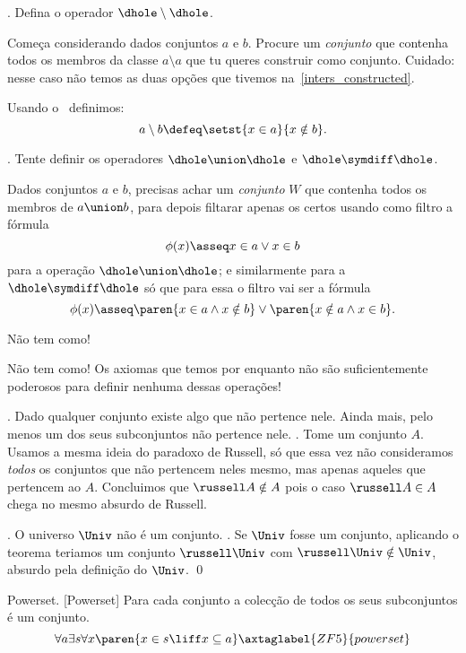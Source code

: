 {%
\exercise.
Defina o operador $\dhole\setminus\dhole$.

\hint
Começa considerando dados conjuntos $a$ e $b$.
Procure um \emph{conjunto} que contenha todos os membros
da classe $a\setminus a$ que tu queres construir como conjunto.
Cuidado: nesse caso não temos as duas opções que tivemos
na~\ref{inters_constructed}.

\solution
Usando o~ definimos:
$$
a\setminus b\defeq \setst {x \in a} {x \notin b}.
$$

\endexercise

\exercise.
\label{cannot_define_union_yet}%
Tente definir os operadores $\dhole\union\dhole$ e $\dhole\symdiff\dhole$.

\hint
Dados conjuntos $a$ e $b$,
precisas achar um \emph{conjunto} $W$
que contenha todos os membros de $a\union b$,
para depois filtarar apenas os certos usando
como filtro a fórmula
$$
\phi(x) \asseq
x \in a \lor x \in b
$$
para a operação $\dhole\union\dhole$;
e similarmente para a $\dhole\symdiff\dhole$ só que
para essa o filtro vai ser a fórmula
$$
\phi(x)\asseq
\paren{x \in a \land x \notin b}
\lor
\paren{x \notin a \land x \in b}.
$$

\hint
Não tem como!

\solution
Não tem como!
Os axiomas que temos por enquanto não são suficientemente poderosos para
definir nenhuma dessas operações!

\endexercise

\theorem.
\label{russells_paradox_to_theorem}%
Dado qualquer conjunto existe algo que não pertence nele.
Ainda mais, pelo menos um dos seus subconjuntos não pertence nele.
\sketch.
Tome um conjunto $A$.
Usamos a mesma ideia do paradoxo de Russell,
só que essa vez não consideramos \emph{todos} os conjuntos que não
pertencem neles mesmo, mas apenas aqueles que pertencem ao $A$.
Concluimos que $\russell A \notin A$ pois o caso $\russell A \in A$ chega 
no mesmo absurdo de Russell.
\qes

\corollary.
\label{Univ_is_not_a_set}%
O universo $\Univ$ não é um conjunto.
\proof.
Se $\Univ$ fosse um conjunto, aplicando o teorema teriamos um conjunto $\russell \Univ$
com $\russell\Univ \notin \Univ$, absurdo pela definição do $\Univ$.
\qed

\axiom Powerset.
[Powerset]%
\label{powerset}%
Para cada conjunto a colecção de todos os seus subconjuntos é um conjunto.
$$
\forall a
\exists s
\forall x
\paren{
x\in s
\liff
x \subseteq a
}
\axtaglabel{ZF5}{powerset}
$$

}
